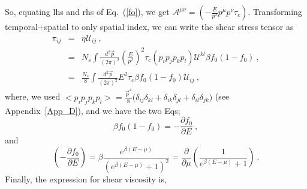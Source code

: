 \documentclass[amsmath,amssymb,aps,prb]{revtex4-2}
\begin{document}
%
%
    So, equating lhs and rhs of Eq.~(\ref{fo}), we get $\mathcal{A}^{\mu \nu}=(-\frac{E}{p^2} p^{\mu} p^{\nu} \tau_c)$. Transforming temporal+spatial to only spatial index, we can write the shear stress tensor as
%
    \begin{eqnarray}
    \pi_{ij}&=& \eta \mathcal{U}_{ij}~,\\
    &=& N_s \int \frac{d^2 \vec{p}}{(2 \pi)^2} \left( \frac{E}{p^2}\right)^2 \tau_c (p_i p_j p_k p_l) \mathcal{U}^{kl} \beta f_0(1-f_0)~,\\
    &=& \frac{N_s}{8} \int \frac{d^2 \vec{p}}{(2 \pi)^2} E^2 \tau_c \beta f_0(1-f_0) \mathcal{U}_{ij}~,
    \end{eqnarray}
%
    where, we used $<p_i p_j p_k p_l>=\frac{\vec{p}^4}{8} \big(\delta_{ij} \delta_{kl}+\delta_{ik}\delta_{jl}+\delta_{il} \delta_{jk} \big)$ (see Appendix~\ref{App_D}), and we have the two Eqs;
    \begin{equation}
    \beta f_0 \left(1-f_0\right) = -\frac{\partial f_0}{\partial E}~,
    \label{waw1}
    \end{equation}
    and
    \begin{equation}
    \left(-\frac{\partial f_0}{\partial E}\right) = \beta \frac{ e^{\beta \left(E - \mu\right)}}{\left(e^{\beta \left(E - \mu\right)} + 1\right)^2} =  \frac{\partial}{\partial \mu} \left( \frac{1}{e^{\beta \left(E - \mu \right)} + 1}\right)~.
    \label{waw2}
    \end{equation}
 Finally, the expression for shear viscosity is,
\end{document}
